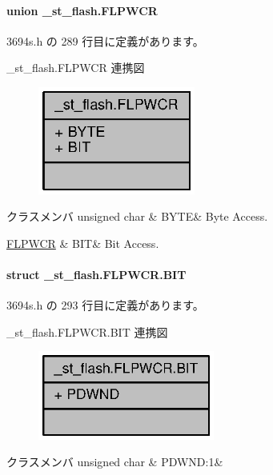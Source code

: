 \paragraph{union \+\_\+st\+\_\+flash.\+F\+L\+P\+W\+C\+R}


 3694s.\+h の 289 行目に定義があります。



\+\_\+st\+\_\+flash.\+F\+L\+P\+W\+C\+R 連携図
\nopagebreak
\begin{figure}[H]
\begin{center}
\leavevmode
\includegraphics[width=146pt]{de/d9d/union__st__flash_8FLPWCR__coll__graph}
\end{center}
\end{figure}
\begin{DoxyFields}{クラスメンバ}
unsigned char\label{3694s_8h_ae409eb2ba6eb6801f52763ae370c350e}
&
B\+Y\+T\+E&
Byte Access. \\
\hline

\hyperlink{3694s_8h_d1/d39/struct__st__flash_8FLPWCR_8BIT}{F\+L\+P\+W\+C\+R}\label{3694s_8h_adb957fdc8000e1eef04a243f5199aa52}
&
B\+I\+T&
Bit Access. \\
\hline

\end{DoxyFields}
\label{struct__st__flash_8FLPWCR_8BIT}
\paragraph{struct \+\_\+st\+\_\+flash.\+F\+L\+P\+W\+C\+R.\+B\+I\+T}


 3694s.\+h の 293 行目に定義があります。



\+\_\+st\+\_\+flash.\+F\+L\+P\+W\+C\+R.\+B\+I\+T 連携図
\nopagebreak
\begin{figure}[H]
\begin{center}
\leavevmode
\includegraphics[width=164pt]{d4/d10/struct__st__flash_8FLPWCR_8BIT__coll__graph}
\end{center}
\end{figure}
\begin{DoxyFields}{クラスメンバ}
unsigned char\label{3694s_8h_a940198c1c3d1a14f20f8836d4e82afcd}
&
P\+D\+W\+N\+D\+:1&
\\
\hline

\end{DoxyFields}
\label{union__st__flash_8EBR1}
